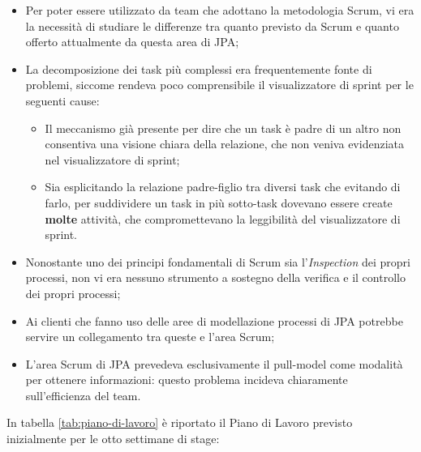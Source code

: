 \begin{itemize}
\item Per poter essere utilizzato da team che adottano la metodologia Scrum,
  vi era la necessità di studiare le differenze tra quanto previsto da Scrum e
  quanto offerto attualmente da questa area di JPA;
\item La decomposizione dei task più complessi era frequentemente fonte di
  problemi, siccome rendeva poco comprensibile il visualizzatore di sprint per
  le seguenti cause:
  \begin{itemize}
  \item Il meccanismo già presente per dire che un task è padre di un altro non
    consentiva una visione chiara della relazione, che non veniva evidenziata
    nel visualizzatore di sprint;
  \item Sia esplicitando la relazione padre-figlio tra diversi task che
    evitando di farlo, per suddividere un task in più sotto-task dovevano
    essere create \textbf{molte} attività, che compromettevano la leggibilità
    del visualizzatore di sprint.
  \end{itemize}
\item Nonostante uno dei principi fondamentali di Scrum sia l'\emph{Inspection}
  dei propri processi, non vi era nessuno strumento a sostegno della verifica
  e il controllo dei propri processi;
\item Ai clienti che fanno uso delle aree di modellazione processi di JPA
  potrebbe servire un collegamento tra queste e l'area Scrum;
\item L'area Scrum di JPA prevedeva esclusivamente il \gls{pull-model} come
  modalità per ottenere informazioni: questo problema incideva chiaramente
  sull'efficienza del team.
\end{itemize}

In tabella \ref{tab:piano-di-lavoro} è riportato il Piano di Lavoro previsto
inizialmente per le otto settimane di stage: \\

